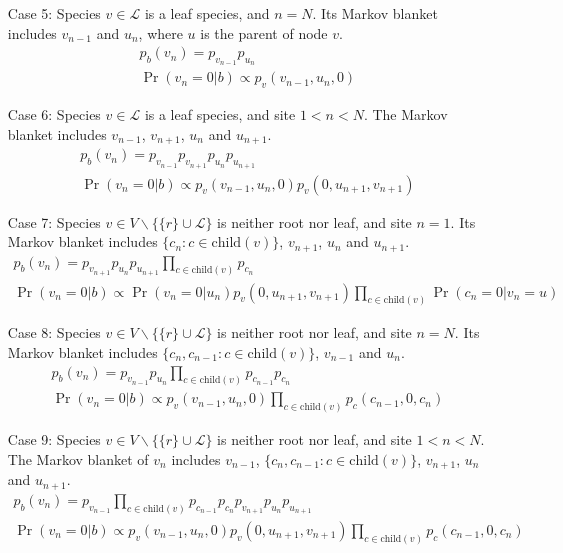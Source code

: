 \documentclass[11pt]{article}
\theoremstyle{theorem}
\theoremstyle{proposition}
\newcommand{\child}[1]{\ensuremath{\mathrm{child}(#1)}}
\begin{document}
\begin{enumerate}
\item[Case 5:] Species $v\in \mathcal{L}$ is a leaf species, and $n=N$. Its
Markov blanket includes $v_{n-1}$ and $u_{n}$, where $u$ is the
parent of node $v$.
\begin{gather*}
 p_b(v_n) = p_{v_{n-1}}p_{u_{n}} \\
  \Pr(v_{n} = 0|b)\propto p_v(v_{n-1}, u_{n}, 0)
\end{gather*}
\item[Case 6:] Species $v \in \mathcal{L}$ is a leaf species, and site $1 < n < N$. The Markov blanket includes $v_{n-1}$, $v_{n+1}$, $u_{n}$ and $u_{n+1}$.
  \begin{gather*}
    p_b(v_n) = p_{v_{n-1}}p_{v_{n+1}}p_{u_{n}}p_{u_{n+1}}\\
    \Pr(v_{n} = 0|b) \propto p_v(v_{n-1}, u_{n}, 0)  p_v(0, u_{n+1}, v_{n+1})
  \end{gather*}
\item[Case 7:] Species $v\in V \backslash\{ \{r\} \cup \mathcal{L}\}$
is neither root nor leaf, and site $n=1$. Its Markov blanket includes
$\{c_{n}: c\in \child{v}\}$, $v_{n+1}$, $u_{n}$ and $u_{n+1}$.
\begin{gather*}
  p_b(v_n) = p_{v_{n+1}}p_{u_n}p_{u_{n+1}}\prod_{c\in \child{v}} p_{c_n}\\
  \Pr(v_{n} = 0|b)\propto \Pr(v_{n} = 0| u_{n}) p_v(0, u_{n+1}, v_{n+1})
                          \prod_{c\in \child{v}} \Pr(c_{n} = 0| v_{n}=u)
\end{gather*}
\item[Case 8:] Species $v\in V\backslash\{\{r\} \cup \mathcal{L}\}$ is
neither root nor leaf, and site $n=N$. Its Markov blanket includes
$\{c_{n},c_{n-1}: c\in \child{v}\}$, $v_{n-1}$ and $u_{n}$.
\begin{gather*}
p_b(v_n)= p_{v_{n-1}}p_{u_{n}}\prod_{c\in\child{v}} p_{c_{n-1}}p_{c_{n}} \\
\Pr(v_{n} = 0|b)\propto p_v(v_{n-1}, u_{n}, 0) \prod_{c\in \child{v}} p_c( c_{n-1}, 0, c_{n})
\end{gather*}
\item[Case 9:] Species $v\in V\backslash\{\{r\} \cup  \mathcal{L}\}$ is neither root nor leaf, and site $1< n < N$. The
Markov blanket of $v_n$ includes $v_{n-1}$, $\{c_{n},c_{n-1}: c\in
\child{v}\}$, $v_{n+1}$, $u_{n}$ and $u_{n+1}$.
  \begin{gather*}
 p_b(v_n)= p_{v_{n-1}}\prod_{c\in\child{v}}p_{c_{n-1}}p_{c_n}p_{v_{n+1}}p_{u_{n}}p_{u_{n+1}}\\
 \Pr(v_{n} = 0|b) \propto p_v(v_{n-1}, u_{n}, 0) p_v(0, u_{n+1}, v_{n+1}) \prod_{c\in \child{v}} p_c(c_{n-1}, 0, c_n)
  \end{gather*}
\end{enumerate}
\end{document}
